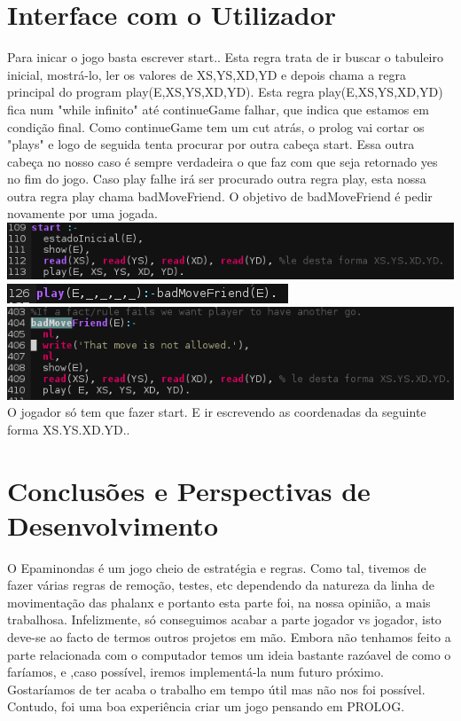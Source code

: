 \documentclass[a4paper]{article}
\begin{document}
\section{Interface com o Utilizador}
Para inicar o jogo basta escrever start.. Esta regra trata de ir buscar o tabuleiro inicial, mostrá-lo, ler os valores de XS,YS,XD,YD e depois chama a regra principal do program play(E,XS,YS,XD,YD). Esta regra play(E,XS,YS,XD,YD) fica num "while infinito" até continueGame falhar, que indica que estamos em condição final. Como continueGame tem um cut atrás, o prolog vai cortar os "plays" e logo de seguida tenta procurar por outra cabeça start. Essa outra cabeça no nosso caso é sempre verdadeira o que faz com que seja retornado yes no fim do jogo. Caso play falhe irá ser procurado outra regra play, esta nossa outra regra play chama badMoveFriend. O objetivo de badMoveFriend é pedir novamente por uma jogada.
\\\linebreak
\includegraphics[scale=0.70]{iniciar.png}
\\\linebreak
\includegraphics[scale=0.70]{iniciar1.png}
\\\linebreak
\includegraphics[scale=0.70]{iniciar2.png}
\\\linebreak
O jogador só tem que fazer start. E ir escrevendo as coordenadas da seguinte forma XS.YS.XD.YD..

\clearpage
\section{Conclusões e Perspectivas de Desenvolvimento}
O Epaminondas é um jogo cheio de estratégia e regras. Como tal, tivemos de fazer várias regras de remoção, testes, etc dependendo da natureza da linha de movimentação das phalanx e portanto esta parte foi, na nossa opinião, a mais trabalhosa. Infelizmente, só conseguimos acabar a parte jogador vs jogador, isto deve-se ao facto de termos outros projetos em mão. Embora não tenhamos feito a parte relacionada com o computador temos um ideia bastante razóavel de como o faríamos, e ,caso possível, iremos implementá-la num futuro próximo.
\\\linebreak
Gostaríamos de ter acaba o trabalho em tempo útil mas não nos foi possível. Contudo, foi uma boa experiência criar um jogo pensando em PROLOG.
\\\linebreak

\clearpage
{}
\renewcommand\refname{Bibliografia}


\end{document}
